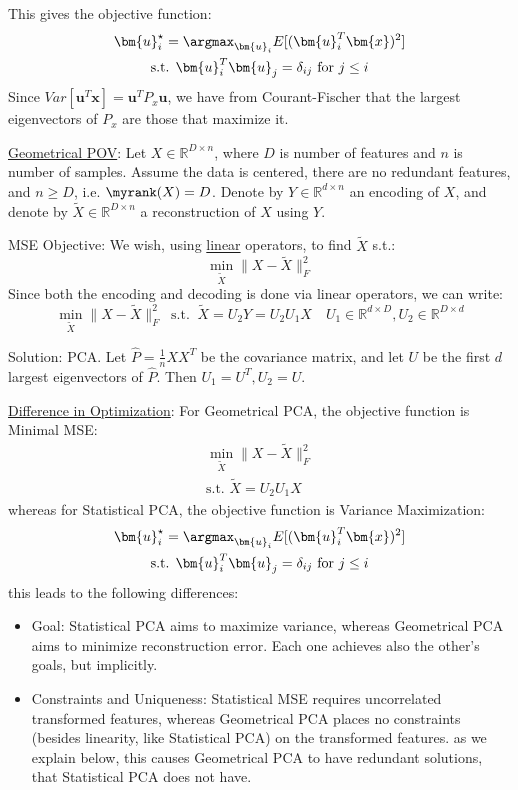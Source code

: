 \documentclass{article}
\begin{document}
This gives the objective function:
\begin{gather*}
  \bm{u}_{i} ^{\star} = \argmax_{\bm{u}_i} E[(\bm{u}_i ^{T} \bm{x})^2]   \\
  \text{s.t. } \bm{u}_i ^{T} \bm{u}_{j} = \delta_{ij} \text{ for } j \leq i
\end{gather*}
Since $Var[\bm{u}^{T} \bm{x}] = \bm{u}^{T} P_{x} \bm{u}$, we have from Courant-Fischer that the largest eigenvectors of $P_{x}$ are those that maximize it. 


\ul{Geometrical POV}: Let $X \in \mathbb{R}^{D \times  n}$, where $D$ is number of features and $n$ is number of samples. Assume the data is centered, there are no redundant features, and $n \geq D$, i.e. $\myrank(X) = D$.  Denote by $Y \in \mathbb{R}^{d \times  n}$ an encoding of $X$, and denote by   $\widetilde{X} \in \mathbb{R}^{D \times  n}$ a reconstruction of $X$ using $Y$.


MSE Objective: We wish, using \ul{linear} operators, to find $\widetilde{X}$ s.t.:
  \[
    \min_{\widetilde{X}} \lVert X - \widetilde{X} \rVert_{F}^2
  \]
Since both the encoding and decoding is done via linear operators, we can write:
\[
  \min_{\widetilde{X}} \lVert X - \widetilde{X} \rVert_{F}^2 \ \text{ s.t. } \ \widetilde{X} = U_{2}Y = U_{2} U_{1}X \quad  U_1 \in \mathbb{R}^{d \times  D}, U_2 \in \mathbb{R}^{D \times d}
\]

Solution: PCA. Let $\hat{P} = \frac{1}{n} X X^{T}$ be the covariance matrix, and let $U$ be the first $d$ largest eigenvectors of $\hat{P}$. Then $U_1 = U ^{T}, U_2 = U$.

\ul{Difference in Optimization}: For Geometrical PCA, the objective function is Minimal MSE:
\begin{gather*}
  \min_{\widetilde{X}} \lVert X - \widetilde{X} \rVert _F ^2 \\
  \text{s.t. } \widetilde{X} = U_{2}U_{1}X 
\end{gather*}
whereas for Statistical PCA, the objective function is Variance Maximization:
\begin{gather*}
  \bm{u}_{i} ^{\star} = \argmax_{\bm{u}_i} E[(\bm{u}_i ^{T} \bm{x})^2]   \\
  \text{s.t. } \bm{u}_i ^{T} \bm{u}_{j} = \delta_{ij} \text{ for } j \leq i
\end{gather*}
this leads to the following differences:
\begin{itemize}

  \item Goal: Statistical PCA aims to maximize variance, whereas Geometrical PCA aims to minimize reconstruction error. Each one achieves also the other's goals, but implicitly. 
  \item Constraints and Uniqueness: Statistical MSE requires uncorrelated transformed features, whereas Geometrical PCA places no constraints (besides linearity, like Statistical PCA) on the transformed features. as we explain below, this causes Geometrical PCA to have redundant solutions, that Statistical PCA does not have.
\end{itemize}
\end{document}
